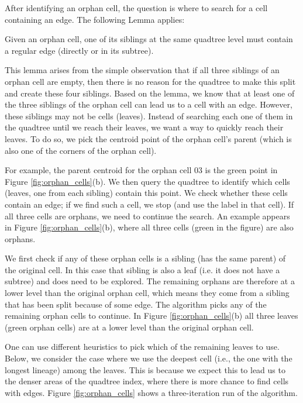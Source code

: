 After identifying an orphan cell, the question
is where to search for a cell containing an edge. The following Lemma applies:

\begin{lemma} %
Given an orphan cell, one of its siblings at the same quadtree level must contain a regular edge (directly or in its subtree). 
\end{lemma}

This lemma arises from the simple observation that if all three siblings of an orphan cell are empty, then there is no reason for the quadtree to make this split and create these four siblings. Based on the lemma, we know that at least one of the three siblings of the orphan cell can lead us to a cell with an edge.   However, these siblings may not be cells (leaves). Instead of searching each one of them in the quadtree until we reach their leaves, we want a way to quickly reach their leaves. To do so, we pick the centroid point of the orphan cell's parent (which is also one of the corners of the orphan cell).

For example, the parent centroid for the orphan cell 03 is the green point in Figure \ref{fig:orphan_cells}(b). We then query the quadtree to identify which cells (leaves, one from each sibling) contain this point. We check whether these cells contain an edge; if we find such a cell, we stop (and use the label in that cell). If all three cells are orphans, we need to continue the search. An example appears in Figure \ref{fig:orphan_cells}(b), where all three cells (green in the figure) are also orphans.

We first check if any of these orphan cells is a sibling (has the same parent) of the original cell. In this case that sibling is also a leaf (i.e. it does not have a subtree) and does need to be explored.  The remaining orphans are therefore at a lower level than the original orphan cell, which means they come from a sibling that has been split because of some edge. The algorithm picks any of the remaining orphan cells to continue. In Figure \ref{fig:orphan_cells}(b) all three leaves (green orphan cells) are at a lower level than the original orphan cell.

One can use different heuristics to pick which of the remaining leaves to use. Below, we consider the case where we use the deepest cell (i.e., the one with the longest lineage) among the leaves. This is because we expect this to lead us to the denser areas of the quadtree index, where there is more chance to find cells with edges. Figure \ref{fig:orphan_cells} shows a three-iteration run of the algorithm.

